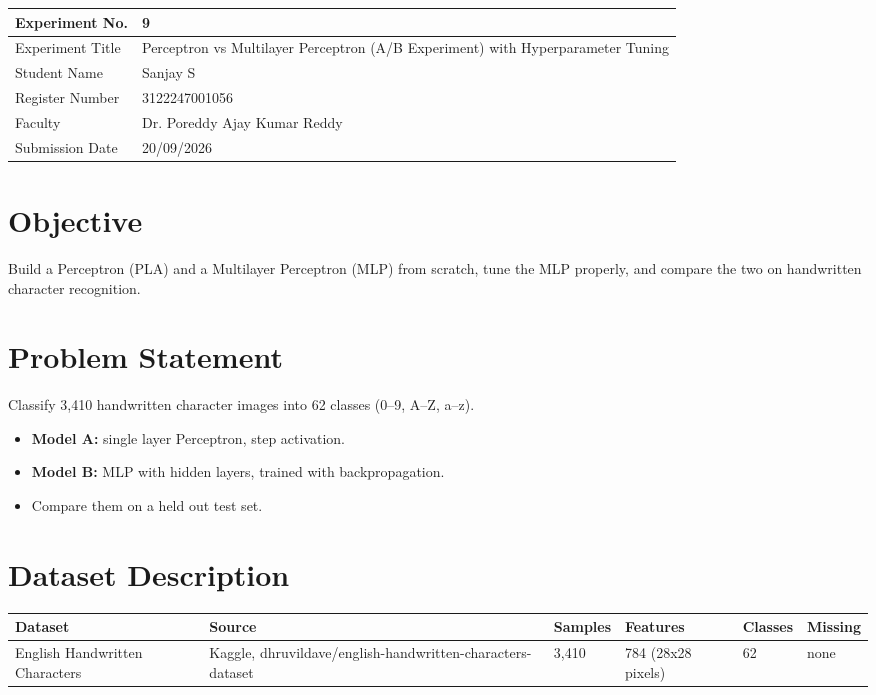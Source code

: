 \documentclass[12pt,a4paper]{article}
\begin{document}
\begin{tabular}{|p{4cm}|p{11cm}|}
\hline
Experiment No. & 9 \\ \hline
Experiment Title & Perceptron vs Multilayer Perceptron (A/B Experiment) with Hyperparameter Tuning\footnotemark \\ \hline
Student Name & Sanjay S \\ \hline
Register Number & 3122247001056 \\ \hline
Faculty & Dr. Poreddy Ajay Kumar Reddy \\ \hline
Submission Date & 20/09/2026 \\ \hline
\end{tabular}

\section{Objective}
Build a Perceptron (PLA) and a Multilayer Perceptron (MLP) from scratch, tune the MLP properly, and compare
the two on handwritten character recognition.

\section{Problem Statement}
Classify 3,410 handwritten character images into 62 classes (0--9, A--Z, a--z).
\begin{itemize}
\item \textbf{Model A:} single layer Perceptron, step activation.
\item \textbf{Model B:} MLP with hidden layers, trained with backpropagation.
\item Compare them on a held out test set.
\end{itemize}

\section{Dataset Description}
\begin{longtable}{|p{2.8cm}|p{3.7cm}|p{1.5cm}|p{2.6cm}|p{1.5cm}|p{1.4cm}|}
\hline
\textbf{Dataset} & \textbf{Source} & \textbf{Samples} & \textbf{Features} & \textbf{Classes} & \textbf{Missing} \\ \hline
English Handwritten Characters & Kaggle, dhruvildave\slash english-handwritten-characters-dataset & 3{,}410 & 784 (28x28 pixels) & 62 & none \\ \hline
\end{longtable}
\end{document}
